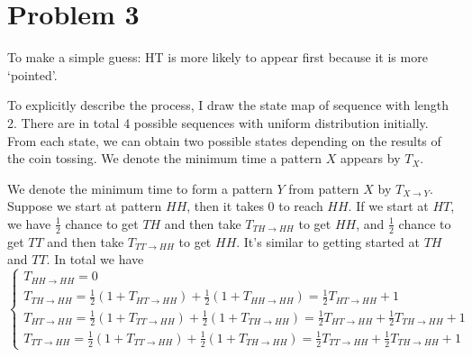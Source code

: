 \documentclass{article}
\theoremstyle{definition}
\begin{document}
	\section*{Problem 3}
	To make a simple guess: HT is more likely to appear first because it is more `pointed'.
	
	\noindent To explicitly describe the process, I draw the state map of sequence with length 2. There are in total 4 possible sequences with uniform distribution initially. From each state, we can obtain two possible states depending on the results of the coin tossing. We denote the minimum time a pattern $X$ appears by $T_X$. 
	\begin{center}
	\end{center}
	We denote the minimum time to form a pattern $Y$ from pattern $X$ by $T_{X\rightarrow Y}$. Suppose we start at pattern $HH$, then it takes 0 to reach $HH$. If we start at $HT$, we have $\frac{1}{2}$ chance to get $TH$ and then take $T_{TH\rightarrow HH}$ to get $HH$, and $\frac{1}{2}$ chance to get $TT$ and then take $T_{TT\rightarrow HH}$ to get $HH$. It's similar to getting started at $TH$ and $TT$. In total we have
	$$
	\left\{
	\begin{array}{l}
		T_{HH\rightarrow HH} = 0 \\
		T_{TH\rightarrow HH} = \frac{1}{2}(1+T_{HT\rightarrow HH}) + \frac{1}{2}(1+T_{HH\rightarrow HH}) = \frac{1}{2}T_{HT\rightarrow HH} + 1 \\
		T_{HT\rightarrow HH} = \frac{1}{2}(1+T_{TT\rightarrow HH}) + \frac{1}{2}(1+T_{TH\rightarrow HH}) = \frac{1}{2}T_{HT\rightarrow HH} + \frac{1}{2}T_{TH\rightarrow HH} + 1 \\
		T_{TT\rightarrow HH} = \frac{1}{2}(1+T_{TT\rightarrow HH}) + \frac{1}{2}(1+T_{TH\rightarrow HH}) = \frac{1}{2}T_{TT\rightarrow HH} + \frac{1}{2}T_{TH\rightarrow HH} + 1
	\end{array}
	\right.
	$$
\end{document}

